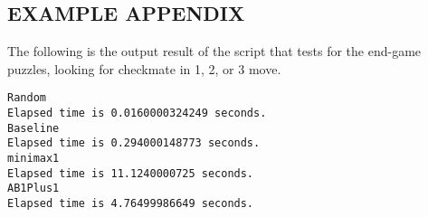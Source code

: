 \documentclass[10pt,journal,compsoc]{IEEEtran}
\begin{document}
{}


\begin{appendices}
\section{EXAMPLE APPENDIX}
The following is the output result of the script that tests for the end-game puzzles, looking for checkmate in 1, 2, or 3 move. \\

\lstset{
basicstyle=\small\ttfamily,
columns=flexible,
breaklines=true
}
\begin{lstlisting}
Random
Elapsed time is 0.0160000324249 seconds.
Baseline
Elapsed time is 0.294000148773 seconds.
minimax1
Elapsed time is 11.1240000725 seconds.
AB1Plus1
Elapsed time is 4.76499986649 seconds.
\end{lstlisting}
\end{appendices}

\end{document}
